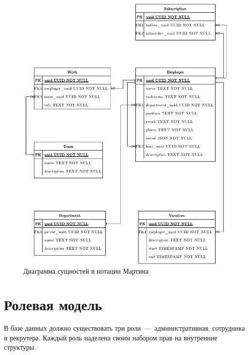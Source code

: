 \begin{figure}[h!]
\centering
    \includegraphics[width=0.9\linewidth]{assets/martin.pdf}
    \caption{Диаграмма сущностей в нотации Мартина}
    \label{img:martin}	
\end{figure}

\section{Ролевая модель}
В базе данных должно существовать три роли~---~административная, сотрудника и рекрутера. Каждый роль наделена своим набором прав на внутренние структуры.

